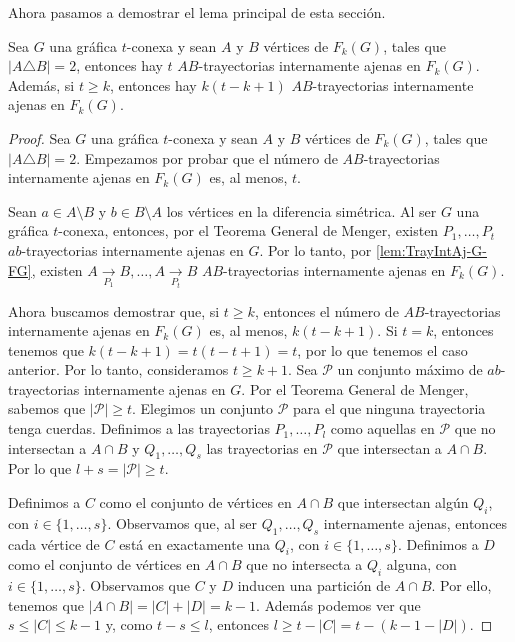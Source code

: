 Ahora pasamos a demostrar el lema principal de esta secci\'on.

\begin{lema}%
\label{lem:TrayIntAj}
    Sea $G$ una gr\'afica $t$-conexa y sean $A$ y $B$ v\'ertices de $F_{k}(G)$,
    tales que $|A \triangle B| = 2$, entonces hay $t$ $AB$-trayectorias
    internamente ajenas en $F_{k}(G)$. Adem\'as, si $t \geq k$, entonces hay
    $k(t- k + 1)$ $AB$-trayectorias internamente ajenas en $F_{k}(G)$.
\end{lema}

\begin{proof}
    Sea $G$ una gr\'afica $t$-conexa y sean $A$ y $B$ v\'ertices de $F_{k}(G)$,
    tales que $|A \triangle B| = 2$. Empezamos por probar que el n\'umero de
    $AB$-trayectorias internamente ajenas en $F_{k}(G)$ es, al menos, $t$. 
    
    Sean $a \in A \setminus B$ y $b \in B \setminus A$ los v\'ertices en la
    diferencia sim\'etrica. Al ser $G$ una gr\'afica $t$-conexa, entonces, por
    el Teorema General de Menger, existen $P_{1}, \dots, P_{t}$
    $ab$-trayectorias internamente ajenas en $G$. Por lo tanto, por
    \cref{lem:TrayIntAj-G-FG}, existen $A \xrightarrow[P_1]{}  B, \dots, A
    \xrightarrow[P_t]{}  B$ $AB$-trayectorias internamente ajenas en $F_{k}(G)$. 

    Ahora buscamos demostrar que, si $t \geq k$, entonces el n\'umero de
    $AB$-trayectorias internamente ajenas en $F_{k}(G)$ es, al menos, $k(t- k
    +1)$. Si $t=k$, entonces tenemos que $k(t - k + 1) = t(t-t+1) = t$, por lo
    que tenemos el caso anterior. Por lo tanto, consideramos  $t \geq k + 1$.
    Sea $\mathcal{P}$ un conjunto m\'aximo de $ab$-trayectorias internamente
    ajenas en $G$. Por el Teorema General de Menger, sabemos que $|\mathcal{P}|
    \ge t$. Elegimos un conjunto $\mathcal{P}$ para el que ninguna trayectoria
    tenga cuerdas. Definimos a las trayectorias $P_{1}, \dots, P_{l}$ como
    aquellas en $\mathcal{P}$ que no intersectan a $A \cap B$ y $Q_{1}, \dots,
    Q_{s}$ las trayectorias en $\mathcal{P}$ que intersectan a $A \cap B$. Por
    lo que $l + s = |\mathcal{P}| \ge t$.

    Definimos a $C$ como el conjunto de v\'ertices en $A \cap B$ que intersectan
    alg\'un $Q_i$, con $i \in \{1, \dots, s\}$. Observamos que, al ser $Q_1,
    \dots, Q_s$ internamente ajenas, entonces cada v\'ertice de $C$ est\'a en
    exactamente una $Q_i$, con $i \in \{1, \dots, s\}$. Definimos a $D$ como el
    conjunto de v\'ertices en $A \cap B$ que no intersecta a $Q_i$ alguna, con
    $i \in \{1, \dots, s\}$. Observamos que $C$ y $D$ inducen una partici\'on de
    $A \cap B$. Por ello, tenemos que $|A\cap B| = |C| + |D| = k-1$. Adem\'as
    podemos ver que $s \leq |C| \leq k-1$ y, como $ t - s \leq l$, entonces $l
    \geq t -|C| = t- (k-1-|D|)$.


\end{proof}
